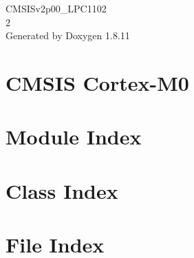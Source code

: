 \documentclass[twoside]{book}
\newcommand{\+}{\discretionary{\mbox{\scriptsize$\hookleftarrow$}}{}{}}
\newcommand{\clearemptydoublepage}{%
  \newpage{\pagestyle{empty}\cleardoublepage}%
}
\begin{document}
\hypersetup{pageanchor=false,
             bookmarksnumbered=true,
             pdfencoding=unicode
            }
\begin{titlepage}
\vspace*{7cm}
\begin{center}%
{\Large C\+M\+S\+I\+Sv2p00\+\_\+\+L\+P\+C1102 \\[1ex]\large 2 }\\
\vspace*{1cm}
{\large Generated by Doxygen 1.8.11}\\
\end{center}
\end{titlepage}
\clearemptydoublepage
\tableofcontents
\clearemptydoublepage
{}
\hypersetup{pageanchor=true}

\chapter{C\+M\+S\+IS Cortex-\/\+M0}
\label{index}\hypertarget{index}{}
\chapter{Module Index}

\chapter{Class Index}

\chapter{File Index}

\end{document}
